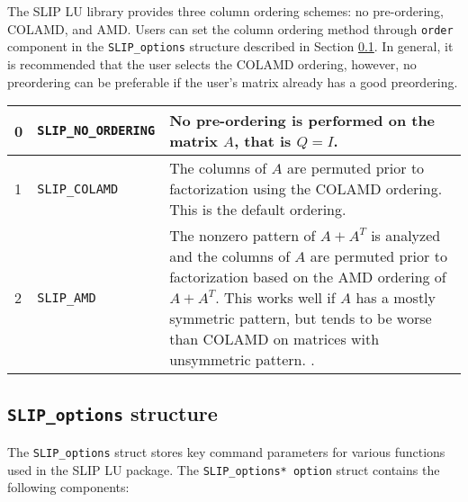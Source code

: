 \documentclass[12pt]{article}
\theoremstyle{definition}
\begin{document}
The SLIP LU library provides three column ordering schemes: no pre-ordering,
COLAMD, and AMD. Users can set the column ordering method through \verb|order|
component in the \verb|SLIP_options| structure described in Section
\ref{ss:SLIP_options_struct}. In general, it is recommended that the user selects the
COLAMD ordering, however, no preordering can be preferable if the user's matrix
already has a good preordering.

{\small
\begin{center}
\begin{tabular}{llp{4in}}
\hline
0 & \verb|SLIP_NO_ORDERING| & No pre-ordering is performed on the matrix $A$,
                              that is $Q = I$. \\
\hline
1 & \verb|SLIP_COLAMD|      & The columns of $A$ are permuted prior to
                              factorization using the COLAMD
                              \cite{davis2004algorithmcolamd} ordering.
                              This is the default ordering. \\
\hline
2 & \verb|SLIP_AMD|         & The nonzero pattern of $A + A^T$ is analyzed and
                              the columns of $A$ are permuted prior to
                              factorization based on the AMD
                              \cite{amestoy2004algorithmamd} ordering of
                              $A+A^T$. This works well if $A$ has a mostly
                              symmetric pattern, but tends to be worse
                              than COLAMD on matrices with unsymmetric pattern.
                              \cite{davis2004column}.\\
\hline
\end{tabular}
\label{tab:SLIP_pivot}
\end{center}
}

\cprotect\subsection{ \verb|SLIP_options| structure}
\label{ss:SLIP_options_struct}

The \verb|SLIP_options| struct stores key command parameters for various
functions used in the SLIP LU package. The \verb|SLIP_options* option| struct
contains the following components:
\end{document}
